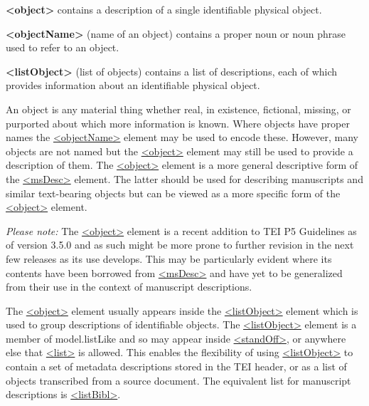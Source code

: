 \begin{sansreflist}
  
\item [\textbf{<object>}] contains a description of a single identifiable physical object.
\item [\textbf{<objectName>}] (name of an object) contains a proper noun or noun phrase used to refer to an object.
\item [\textbf{<listObject>}] (list of objects) contains a list of descriptions, each of which provides information about an identifiable physical object.
\end{sansreflist}
 An object is any material thing whether real, in existence, fictional, missing, or purported about which more information is known. Where objects have proper names the \hyperref[TEI.objectName]{<objectName>} element may be used to encode these. However, many objects are not named but the \hyperref[TEI.object]{<object>} element may still be used to provide a description of them. The \hyperref[TEI.object]{<object>} element is a more general descriptive form of the \hyperref[TEI.msDesc]{<msDesc>} element. The latter should be used for describing manuscripts and similar text-bearing objects but can be viewed as a more specific form of the \hyperref[TEI.object]{<object>} element.\par
 \textit{Please note:} The \hyperref[TEI.object]{<object>} element is a recent addition to TEI P5 Guidelines as of version 3.5.0 and as such might be more prone to further revision in the next few releases as its use develops. This may be particularly evident where its contents have been borrowed from \hyperref[TEI.msDesc]{<msDesc>} and have yet to be generalized from their use in the context of manuscript descriptions.\par
The \hyperref[TEI.object]{<object>} element usually appears inside the \hyperref[TEI.listObject]{<listObject>} element which is used to group descriptions of identifiable objects. The \hyperref[TEI.listObject]{<listObject>} element is a member of \textsf{model.listLike} and so may appear inside \hyperref[TEI.standOff]{<standOff>}, or anywhere else that \hyperref[TEI.list]{<list>} is allowed. This enables the flexibility of using \hyperref[TEI.listObject]{<listObject>} to contain a set of metadata descriptions stored in the TEI header, or as a list of objects transcribed from a source document. The equivalent list for manuscript descriptions is \hyperref[TEI.listBibl]{<listBibl>}.\par

